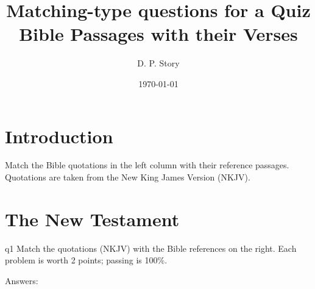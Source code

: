\documentclass[11pt]{article}
\title{Matching-type questions for a Quiz\texorpdfstring{\\[1ex]}{: }Bible Passages with their Verses}
\author{D. P. Story}
\date{\today}
\begin{document}
\maketitle

\section*{Introduction}

Match the Bible quotations in the left column with their reference passages.
Quotations are taken from the \textsf{New King James Version (NKJV)}.

\section*{The New Testament}

\begin{quiz}{q1}
Match the quotations (\textsf{NKJV)} with the Bible references on the right.
Each problem is worth 2 points; passing is 100\%.

\noindent
\begin{minipage}[t]{.75\linewidth}
\useNumbersOn
\begin{questions}
\begin{BblPsg}
  \item{}
  \item{}
  \item{}
\end{BblPsg}
\end{questions}
\end{minipage}\hfill
\begin{minipage}[t][0pt]{.25\linewidth-10pt}
\hideCreditMarkup
\begin{questions}[itemsep={0pt}]
\begin{BblVrs}
  \item{}
  \item{}
  \item{}
  \item{}
  \item{}
  \item{}
\end{BblVrs}
\end{questions}
\end{minipage}
\par\medskip
\end{quiz}\quad\PointsField\currQuiz\olBdry\CorrButton\currQuiz\cgBdry[6pt]
Answers: 
\end{document}
